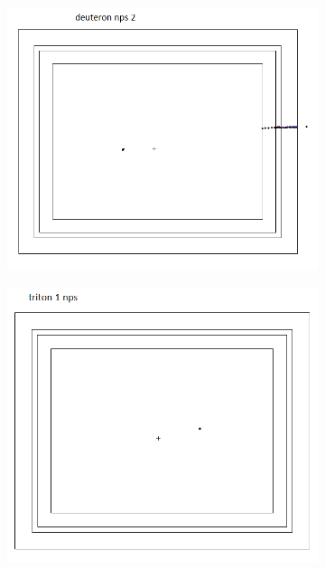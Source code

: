 \documentclass{mc2015}
\begin{document}
\begin{figure}[H]
        \begin{subfigure}[b]{0.2\textwidth}
                \includegraphics[width=\textwidth]{figures/fig_mcnp_dist_d.png}
                \label{fig:mcnp_dist_d}
        \end{subfigure}
        \begin{subfigure}[b]{0.2\textwidth}
                \includegraphics[width=\textwidth]{figures/fig_mcnp_dist_t.png}
                \label{fig:mcnp_dist_t}

\end{subfigure}
\end{figure}
\end{document}
